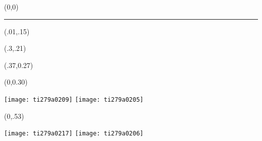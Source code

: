 \pagestyle{empty}

\begin{textblock}{1}(0,0)
    \noindent\textcolor{plop}{\rule{\paperwidth}{.315\paperheight}}
\end{textblock}





\begin{textblock}{1}(.01,.15)
    \noindent {\fontsize{33.5}{2}\selectfont
    \bfseries\textcolor{white}{十分钟就能学会并可以终生受用的技能？}}
\end{textblock}

\begin{textblock}{1}(.3,.21)
     \noindent{\fontsize{20.74}{2}\selectfont
         \bfseries\textcolor{white}{谭兵(bingtan72@gmail.com)}}
\end{textblock}

\begin{textblock}{1}(.37,0.27)
	\noindent{\fontsize{20.74}{2}\selectfont
		\bfseries\textcolor{white}{2017年3月18日}}
\end{textblock}



\begin{textblock}{1}(0,0.30)
	\begin{center}
		\texttt{[image: ti279a0209]}
		\texttt{[image: ti279a0205]}
	\end{center}
\end{textblock}

\begin{textblock}{1}(0,.53)
    \begin{center}
        \texttt{[image: ti279a0217]}
        \texttt{[image: ti279a0206]}
    \end{center}
\end{textblock}

